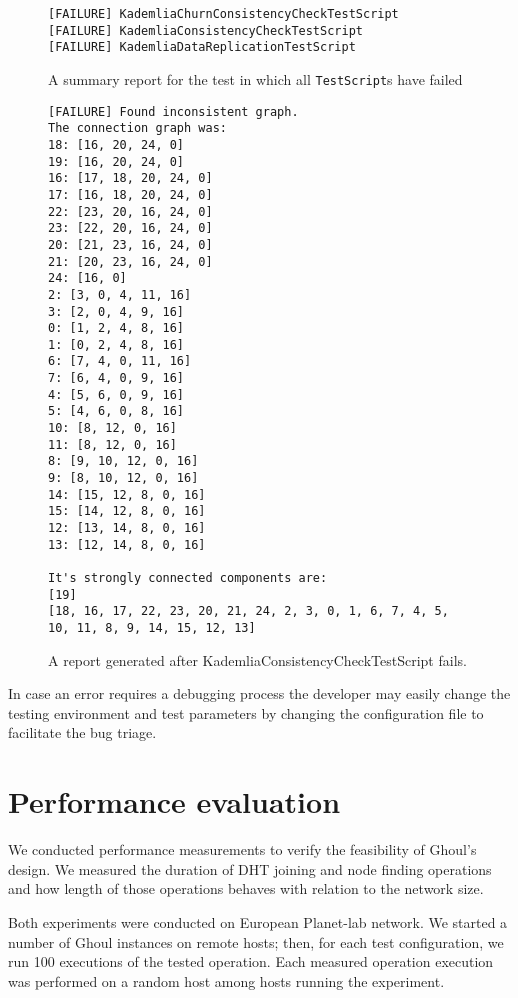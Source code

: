 \begin{figure}[tbp]
\begin{verbatim}
[FAILURE] KademliaChurnConsistencyCheckTestScript
[FAILURE] KademliaConsistencyCheckTestScript
[FAILURE] KademliaDataReplicationTestScript
\end{verbatim}
\caption{A summary report for the test in which all \texttt{TestScript}s have
failed}
\label{fig:sumrep_failure}
\end{figure}

\begin{figure}[tbp]
\begin{verbatim}
[FAILURE] Found inconsistent graph.
The connection graph was:
18: [16, 20, 24, 0]
19: [16, 20, 24, 0]
16: [17, 18, 20, 24, 0]
17: [16, 18, 20, 24, 0]
22: [23, 20, 16, 24, 0]
23: [22, 20, 16, 24, 0]
20: [21, 23, 16, 24, 0]
21: [20, 23, 16, 24, 0]
24: [16, 0]
2: [3, 0, 4, 11, 16]
3: [2, 0, 4, 9, 16]
0: [1, 2, 4, 8, 16]
1: [0, 2, 4, 8, 16]
6: [7, 4, 0, 11, 16]
7: [6, 4, 0, 9, 16]
4: [5, 6, 0, 9, 16]
5: [4, 6, 0, 8, 16]
10: [8, 12, 0, 16]
11: [8, 12, 0, 16]
8: [9, 10, 12, 0, 16]
9: [8, 10, 12, 0, 16]
14: [15, 12, 8, 0, 16]
15: [14, 12, 8, 0, 16]
12: [13, 14, 8, 0, 16]
13: [12, 14, 8, 0, 16]

It's strongly connected components are:
[19]
[18, 16, 17, 22, 23, 20, 21, 24, 2, 3, 0, 1, 6, 7, 4, 5, 10, 11, 8, 9, 14, 15, 12, 13]
\end{verbatim}
\caption{A report generated after KademliaConsistencyCheckTestScript fails.}
\label{fig:conrep}
\end{figure}

In case an error requires a debugging process the developer may easily change
the testing environment and test parameters by changing the configuration file
to facilitate the bug triage.

\section{Performance evaluation}
\label{sec:performance}

We conducted performance measurements to verify the feasibility of Ghoul's
design. 
We measured the duration of DHT joining and node finding operations and how
length of those operations behaves with relation to the network size.

Both experiments were conducted on European Planet-lab network.
We started a number of Ghoul instances on remote hosts; then, for each test
configuration, we run 100 executions of the tested operation.
Each measured operation execution was performed on a random host among hosts
running the experiment.

